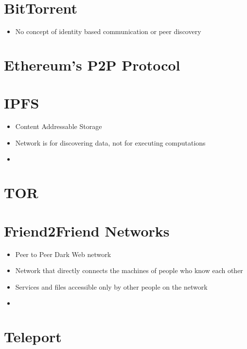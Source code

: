\hypertarget{bittorrent}{%
\section{BitTorrent}\label{bittorrent}}

\begin{itemize}
\tightlist
\item
  No concept of identity based communication or peer discovery
\end{itemize}

\hypertarget{ethereums-p2p-protocol}{%
\section{Ethereum's P2P Protocol}\label{ethereums-p2p-protocol}}

\hypertarget{ipfs}{%
\section{IPFS}\label{ipfs}}

\begin{itemize}
\tightlist
\item
  Content Addressable Storage
\item
  Network is for discovering data, not for executing computations
\item
\end{itemize}

\hypertarget{tor}{%
\section{TOR}\label{tor}}

\hypertarget{friend2friend-networks}{%
\section{Friend2Friend Networks}\label{friend2friend-networks}}

\begin{itemize}
\tightlist
\item
  Peer to Peer Dark Web network
\item
  Network that directly connects the machines of people who know each
  other
\item
  Services and files accessible only by other people on the network
\item
\end{itemize}

\hypertarget{teleport}{%
\section{Teleport}\label{teleport}}


